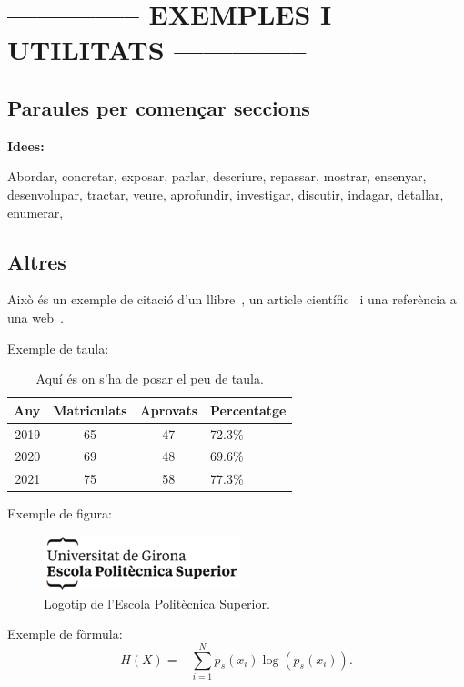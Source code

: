 \documentclass[a4paper,12pt]{ThesisStyle}
\begin{document}
\section{-------------- EXEMPLES I UTILITATS --------------}
\subsection{Paraules per començar seccions}
\textbf{Idees:}

Abordar, concretar, exposar, parlar, descriure, repassar, mostrar, ensenyar, desenvolupar, tractar, veure, aprofundir, investigar, discutir, indagar, detallar,
enumerar,


\subsection{Altres}

Això és un exemple de citació d'un llibre~\cite{Coleman1974}, un article científic~\cite{Ruiz2008} i una referència a una web~\cite{Halcon}.

Exemple de taula:
\begin{table}[htb]
\centering
\begin{tabular}{ | r | c | c | l | }
 \hline
  Any & Matriculats & Aprovats & Percentatge\\
\hline
 2019  & 65 & 47 & 72.3\%\\
 2020  & 69 & 48 & 69.6\%\\
 2021  & 75 & 58 & 77.3\%\\
  \hline
  \end{tabular}
\caption{\label{taula:taulaexemple} Aquí és on s'ha de posar el peu de taula. }
\end{table}

Exemple de figura:
\begin{figure}[htb]
\centering
\includegraphics[width=8 cm]{imatges/logo_eps.png}
\caption{\label{fig:logo} Logotip de l'Escola Politècnica Superior.}
\end{figure}

Exemple de fòrmula:
\begin{equation}
H(X) = -\sum_{i=1}^{N}p_s(x_i) \log \left( p_s(x_i) \right).
\label{equ:entropia}
\end{equation}
\end{document}
